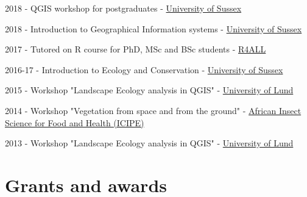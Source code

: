 \documentclass[12pt,a4paper,serif]{moderncv}        %
\begin{document}
\begin{bibenum}

     \item[] 2018 - QGIS workshop for postgraduates - \href{http://sussex.ac.uk/}{University of Sussex}
     
     \item[] 2018 - Introduction to Geographical Information systems - \href{http://sussex.ac.uk/}{University of Sussex}

     \item[] 2017 - Tutored on R course for PhD, MSc and BSc students - \href{http://www.r4all.org/}{R4ALL}
     
     \item[] 2016-17 - Introduction to Ecology and Conservation - \href{http://sussex.ac.uk/}{University of Sussex}

     \item[] 2015 - Workshop "Landscape Ecology analysis in QGIS" - \href{http://www.lunduniversity.lu.se/}{University of Lund}

     \item[] 2014 - Workshop "Vegetation from space and from the ground" - \href{http://www.icipe.org/}{African Insect Science for Food and Health (ICIPE)}

     \item[] 2013 - Workshop "Landscape Ecology analysis in QGIS" - \href{http://www.lunduniversity.lu.se/}{University of Lund}

\end{bibenum}

\vspace{8pt}

\section{Grants and awards}
\end{document}
